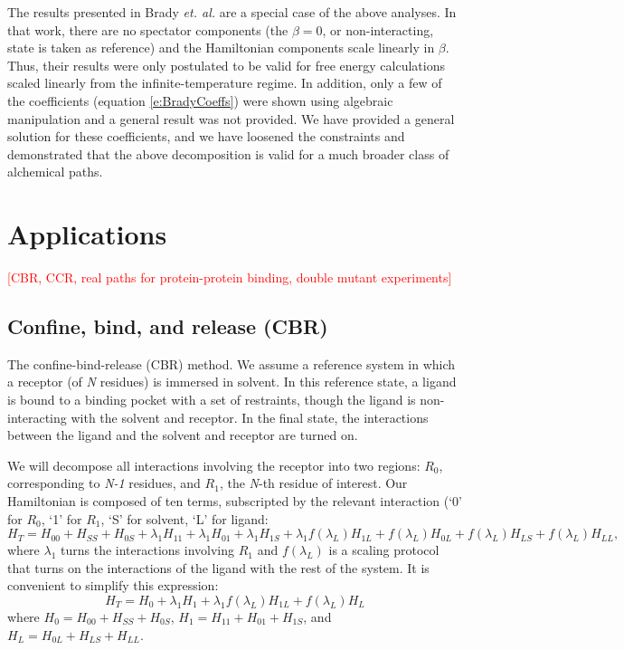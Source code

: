 \documentclass[%
 preprint,
 amsmath,amssymb,
 aps,
]{revtex4-1}
\newcommand{\warning}[1]{{\textsf{{\textcolor{red}{{[#1]}{}}}}}}
\begin{document}
The results presented in Brady \emph{et. al.}\cite{Brady:1996gm} are a special case of the above analyses.  In that work, there are no spectator components (the $\beta=0$, or non-interacting, state is taken as reference) and the Hamiltonian components scale linearly in $\beta$.  Thus, their results were only postulated to be valid for free energy calculations scaled linearly from the infinite-temperature regime.  In addition, only a  few of the coefficients (equation \ref{e:BradyCoeffs}) were shown using algebraic manipulation and a general result was not provided.  We have provided a general solution for these coefficients, and we have loosened the constraints and demonstrated that the above decomposition is valid for a much broader class of alchemical paths.


\section{Applications}
\warning{CBR, CCR, real paths for protein-protein binding, double mutant experiments}

\subsection{Confine, bind, and release (CBR)}

The confine-bind-release (CBR) method.\cite{NULL}  We assume a reference system in which a receptor (of \emph{N} residues) is immersed in solvent. In this reference state, a ligand is bound to a binding pocket with a set of restraints, though the ligand is non-interacting with the solvent and receptor. In the final state, the interactions between the ligand and the solvent and receptor are turned on.

We will decompose all interactions involving the receptor into two regions: $R_0$, corresponding to \emph{N-1} residues, and $R_1$, the \emph{N}-th residue of interest. Our Hamiltonian is composed of ten terms, subscripted by the relevant interaction (`0' for $R_0$, `1' for $R_1$, `S' for solvent, `L' for ligand:
\begin{equation}
H_T = 
H_{00} + H_{SS} + H_{0S} + 
\lambda_1H_{11} + \lambda_1H_{01} + \lambda_1H_{1S} +
\lambda_1f(\lambda_L)H_{1L} + f(\lambda_L)H_{0L} +
f(\lambda_L)H_{LS} + f(\lambda_L)H_{LL},
\label{e:Htot:CBR}
\end{equation}
where $\lambda_1$ turns the interactions involving $R_1$ and $f(\lambda_L)$ is a scaling protocol that turns on the interactions of the ligand with the rest of the system.  It is convenient to simplify this expression:
\begin{equation}
H_T = H_0 + \lambda_1 H_1 + \lambda_1f(\lambda_L)H_{1L} + f(\lambda_L) H_L
\label{e:Htot:CBRsimple}
\end{equation}
where $H_0 = H_{00} + H_{SS} + H_{0S}$, $H_1 =H_{11} +H_{01} +H_{1S} $, and $H_L = H_{0L} + H_{LS} + H_{LL}$. 
\end{document}
